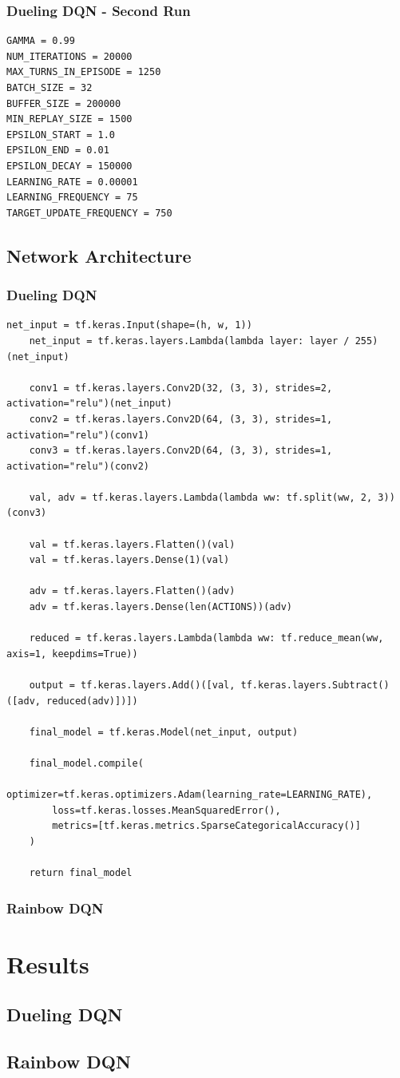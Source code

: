 \documentclass[12pt,a4paper]{article}
\begin{document}
    \subsubsection{Dueling DQN - Second Run}
    \begin{lstlisting}[label={lst:ddqn2hyperparameters}]
GAMMA = 0.99
NUM_ITERATIONS = 20000
MAX_TURNS_IN_EPISODE = 1250
BATCH_SIZE = 32
BUFFER_SIZE = 200000
MIN_REPLAY_SIZE = 1500
EPSILON_START = 1.0
EPSILON_END = 0.01
EPSILON_DECAY = 150000
LEARNING_RATE = 0.00001
LEARNING_FREQUENCY = 75
TARGET_UPDATE_FREQUENCY = 750
    \end{lstlisting}

    \subsection{Network Architecture}\label{subsec:network-architecture}
    \subsubsection{Dueling DQN}
    \begin{lstlisting}[label={lst:dueling}]
    net_input = tf.keras.Input(shape=(h, w, 1))
    net_input = tf.keras.layers.Lambda(lambda layer: layer / 255)(net_input)

    conv1 = tf.keras.layers.Conv2D(32, (3, 3), strides=2, activation="relu")(net_input)
    conv2 = tf.keras.layers.Conv2D(64, (3, 3), strides=1, activation="relu")(conv1)
    conv3 = tf.keras.layers.Conv2D(64, (3, 3), strides=1, activation="relu")(conv2)

    val, adv = tf.keras.layers.Lambda(lambda ww: tf.split(ww, 2, 3))(conv3)

    val = tf.keras.layers.Flatten()(val)
    val = tf.keras.layers.Dense(1)(val)

    adv = tf.keras.layers.Flatten()(adv)
    adv = tf.keras.layers.Dense(len(ACTIONS))(adv)

    reduced = tf.keras.layers.Lambda(lambda ww: tf.reduce_mean(ww, axis=1, keepdims=True))

    output = tf.keras.layers.Add()([val, tf.keras.layers.Subtract()([adv, reduced(adv)])])

    final_model = tf.keras.Model(net_input, output)

    final_model.compile(
        optimizer=tf.keras.optimizers.Adam(learning_rate=LEARNING_RATE),
        loss=tf.keras.losses.MeanSquaredError(),
        metrics=[tf.keras.metrics.SparseCategoricalAccuracy()]
    )

    return final_model
    \end{lstlisting} %


    \subsubsection{Rainbow DQN}

    \section{Results}\label{sec:results}
    \subsection{Dueling DQN}\label{subsec:dueling-dqn2}

    \subsection{Rainbow DQN}\label{subsec:rainbow-dqn2}
\end{document}
